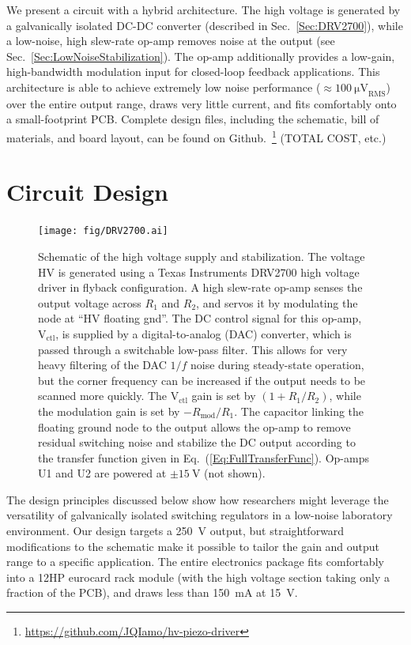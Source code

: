 \documentclass[aip,rsi,reprint]{revtex4-1} %
\begin{document}
We present a circuit with a hybrid architecture. The high voltage is generated by a galvanically isolated DC-DC converter (described in Sec.~\ref{Sec:DRV2700}), while a low-noise, high slew-rate op-amp removes noise at the output  (see Sec.~\ref{Sec:LowNoiseStabilization}).
The op-amp additionally provides a low-gain, high-bandwidth modulation input for closed-loop feedback applications.
This architecture is able to achieve extremely low noise performance ($\approx\SI{100}{\micro\volt}_{\text{RMS}}$) over the entire output range, draws very little current, and fits comfortably onto a small-footprint PCB.
Complete design files, including the schematic, bill of materials, and board layout, can be found on Github.~\footnote{\protect\url{https://github.com/JQIamo/hv-piezo-driver}}
(TOTAL COST, etc.)



\section{Circuit Design}
\label{Sec:Circuit}

\begin{figure}[t]
\texttt{[image: fig/DRV2700.ai]}
\caption{Schematic of the high voltage supply and stabilization.
The voltage HV is generated using a Texas Instruments DRV2700 high voltage driver in flyback configuration.
A high slew-rate op-amp senses the output voltage across $R_1$ and $R_2$, and servos it by modulating the node at ``HV floating gnd''.
The DC control signal for this op-amp,  $\text{V}_{\text{ctl}}$, is supplied by a digital-to-analog (DAC) converter, which is passed through a switchable low-pass filter. This allows for very heavy filtering of the DAC $1/f$ noise during steady-state operation, but the corner frequency can be increased if the output needs to be scanned more quickly.
The $\text{V}_{\text{ctl}}$ gain is set by $\left(1+R_1/R_2\right)$, while the modulation gain is set by $-R_{\text{mod}}/R_1$.
The capacitor linking the floating ground node to the output allows the op-amp to remove residual switching noise and stabilize the DC output according to the transfer function given in Eq.~(\ref{Eq:FullTransferFunc}).
Op-amps U1 and U2 are powered at $\pm\SI{15}{\volt}$ (not shown).
\label{Fig:PiezoCircuit}}
\end{figure}

The design principles discussed below show how researchers might leverage the versatility of galvanically isolated switching regulators in a low-noise laboratory environment. 
Our design targets a \SI{250}{\volt} output, but straightforward modifications to the schematic make it possible to tailor the gain and output range to a specific application.
The entire electronics package fits comfortably into a 12HP eurocard rack module (with the high voltage section taking only a fraction of the PCB), and draws less than \SI{150}{\milli\ampere} at \SI{15}{\volt}.
\end{document}
